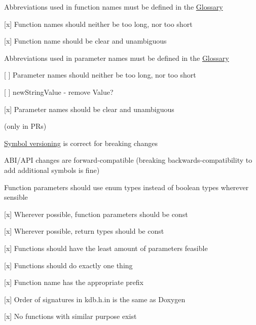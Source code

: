 \begin{DoxyItemize}
\item Abbreviations used in function names must be defined in the \hyperlink{doc_help_elektra-glossary_md}{Glossary}
\item \mbox{[}x\mbox{]} Function names should neither be too long, nor too short
\item \mbox{[}x\mbox{]} Function name should be clear and unambiguous
\item Abbreviations used in parameter names must be defined in the \hyperlink{doc_help_elektra-glossary_md}{Glossary}
\item \mbox{[} \mbox{]} Parameter names should neither be too long, nor too short
\begin{DoxyItemize}
\item \mbox{[} \mbox{]} {\ttfamily new\+String\+Value} -\/ remove Value?
\end{DoxyItemize}
\item \mbox{[}x\mbox{]} Parameter names should be clear and unambiguous
\end{DoxyItemize}

(only in P\+Rs)


\begin{DoxyItemize}
\item \hyperlink{doc_dev_symbol-versioning_md}{Symbol versioning} is correct for breaking changes
\item A\+B\+I/\+A\+PI changes are forward-\/compatible (breaking backwards-\/compatibility to add additional symbols is fine)
\end{DoxyItemize}


\begin{DoxyItemize}
\item Function parameters should use enum types instead of boolean types wherever sensible
\item \mbox{[}x\mbox{]} Wherever possible, function parameters should be {\ttfamily const}
\item \mbox{[}x\mbox{]} Wherever possible, return types should be {\ttfamily const}
\item \mbox{[}x\mbox{]} Functions should have the least amount of parameters feasible
\end{DoxyItemize}


\begin{DoxyItemize}
\item \mbox{[}x\mbox{]} Functions should do exactly one thing
\item \mbox{[}x\mbox{]} Function name has the appropriate prefix
\item \mbox{[}x\mbox{]} Order of signatures in kdb.\+h.\+in is the same as Doxygen
\item \mbox{[}x\mbox{]} No functions with similar purpose exist
\end{DoxyItemize}


